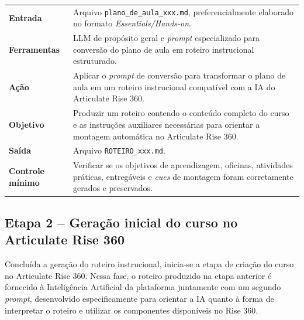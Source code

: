 \documentclass[12pt,a4paper]{article}
\newcommand{\campo}[1]{\textcolor{azulinst}{\textbf{#1}}}
\begin{document}
\begin{longtable}{p{}p{}}
\toprule
\campo{Entrada} &
Arquivo \texttt{plano\_de\_aula\_xxx.md}, preferencialmente elaborado no formato \textit{Essentials/Hands-on}. \\
\vspace{0.05cm}
\campo{Ferramentas} &
\vspace{0.05cm}
LLM de propósito geral e \textit{prompt} especializado para conversão do plano de aula em roteiro instrucional estruturado. \\
\vspace{0.05cm}
\campo{Ação} &
\vspace{0.05cm}
Aplicar o \textit{prompt} de conversão para transformar o plano de aula em um roteiro instrucional compatível com a IA do Articulate Rise 360. \\
\vspace{0.05cm}
\campo{Objetivo} &
\vspace{0.05cm}
Produzir um roteiro contendo o conteúdo completo do curso e as instruções auxiliares necessárias para orientar a montagem automática no Articulate Rise 360. \\
\vspace{0.05cm}
\campo{Saída} &
\vspace{0.05cm}
Arquivo \texttt{ROTEIRO\_xxx.md}. \\
\vspace{0.05cm}
\campo{Controle mínimo} &
\vspace{0.05cm}
Verificar se os objetivos de aprendizagem, oficinas, atividades práticas, entregáveis e \textit{cues} de montagem foram corretamente gerados e preservados. \\

\bottomrule
\end{longtable}

\subsection{Etapa 2 -- Geração inicial do curso no Articulate Rise 360}

Concluída a geração do roteiro instrucional, inicia-se a etapa de criação do curso no Articulate Rise 360. Nessa fase, o roteiro produzido na etapa anterior é fornecido à Inteligência Artificial da plataforma juntamente com um segundo \textit{prompt}, desenvolvido especificamente para orientar a IA quanto à forma de interpretar o roteiro e utilizar os componentes disponíveis no Rise 360.
\end{document}
